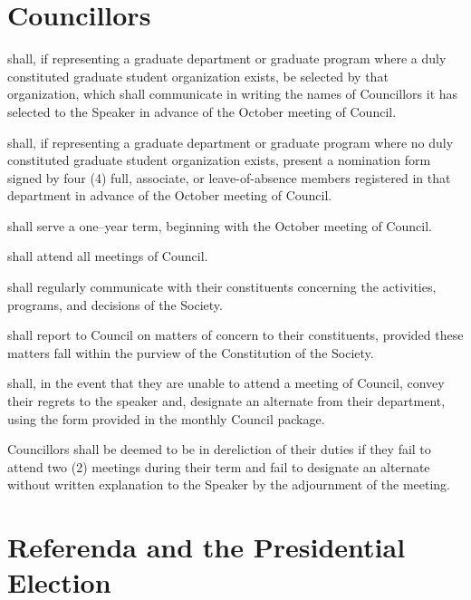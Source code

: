 \section{Councillors}
\begin{longenum}[ label*=\thesection.\arabic*., align=left]
	\item shall, if representing a graduate department or graduate program where a duly constituted graduate student organization exists, be selected by that organization, which shall communicate in writing the names of Councillors it has selected to the Speaker in advance of the October meeting of Council. 
    \item shall, if representing a graduate department or graduate program where no duly constituted graduate student organization  exists, present a nomination form signed by four (4) full, associate, or leave-of-absence members registered in that department in advance of the October meeting of Council. 
    \item shall serve a one--year term, beginning with the October meeting of Council. 
    \item shall attend all meetings of Council.
    \item shall regularly communicate with their constituents concerning the activities, programs, and decisions of the Society. 
    \item shall report to Council on matters of concern to their constituents, provided these matters fall within the purview of the Constitution of the Society. 
    \item shall, in the event that they are unable to attend a meeting of Council, convey their regrets to the speaker and, designate an alternate from their department, using the form provided in the monthly Council package.
    \item Councillors shall be deemed to be in dereliction of their duties if they fail to attend two (2) meetings during their term and fail to designate an alternate without written explanation to the Speaker by the adjournment  of the meeting. 
\end{longenum}
\newpage

\section{Referenda and the Presidential Election}
 



